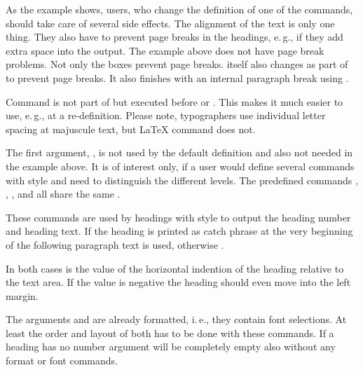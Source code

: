 As the example shows, users, who change the definition of one of the commands,
should take care of several side effects. The alignment of the text is only
one thing. They also have to prevent page breaks in the headings, e.\,g., if
they add extra space into the output. The example above does not have page
break problems. Not only the boxes prevent page breaks. \KOMAScript{} itself
also changes  as part of  to prevent page
breaks. It also finishes  with an internal paragraph break using
.

Command  is not part of  but
executed before  or
. This makes it much easier to use, e.\,g.,
 at a re-definition. Please note, typographers use
individual letter spacing at majuscule text, but \LaTeX{} command
 does not.

The first argument, , is not used by the default definition and
also not needed in the example above. It is of interest only, if a user would
define several commands with  style and need to distinguish
the different levels. The predefined commands ,
, , and
 all share the same 
.%
\EndIndexGroup


\begin{Declaration}
\end{Declaration}
These commands are used by headings with style 
to output the heading number and heading text. If the heading is printed as
catch phrase at the very beginning of the following paragraph text
 is used, otherwise
.

In both cases  is the value of the horizontal indention of the
heading relative to the text area. If the value is negative the heading should
even move into the left margin.

The arguments  and  are already formatted, i.\,e.,
they contain font selections. At least the order and layout of both has to be
done with these commands. If a heading has no number argument 
will be completely empty also without any format or font commands.

